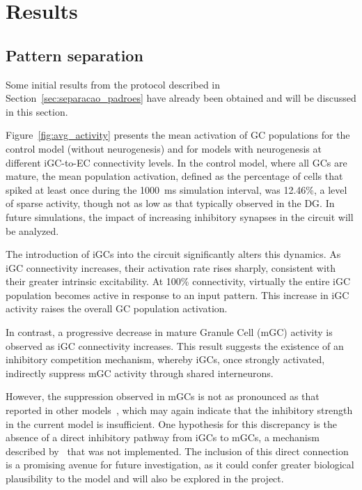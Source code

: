 \chapter{Results}

\section{Pattern separation}


Some initial results from the protocol described in Section~\ref{sec:separacao_padroes} have already been obtained and will be
discussed in this section.

Figure~\ref{fig:avg_activity} presents the mean activation of GC populations for the control model (without neurogenesis) and
for models with neurogenesis at different iGC-to-EC connectivity levels. In the control model, where all GCs are mature, the
mean population activation, defined as the percentage of cells that spiked at least once during the \SI{1000}{\milli\second}
simulation interval, was 12.46\%, a level of sparse activity, though not as low as that typically observed in the DG\@. In
future simulations, the impact of increasing inhibitory synapses in the circuit will be analyzed.

The introduction of iGCs into the circuit significantly alters this dynamics. As iGC connectivity increases, their activation
rate rises sharply, consistent with their greater intrinsic excitability. At 100\% connectivity, virtually the entire iGC
population becomes active in response to an input pattern. This increase in iGC activity raises the overall GC population
activation.

In contrast, a progressive decrease in mature Granule Cell (mGC) activity is observed as iGC connectivity increases. This
result suggests the existence of an inhibitory competition mechanism, whereby iGCs, once strongly activated, indirectly suppress
mGC activity through shared interneurons.

However, the suppression observed in mGCs is not as pronounced as that reported in other models~\parencite{kimEffect2024}, which may
again indicate that the inhibitory strength in the current model is insufficient. One hypothesis for this discrepancy is the
absence of a direct inhibitory pathway from iGCs to mGCs, a mechanism described by~\textcite{lunaAdultborn2019} that was not
implemented. The inclusion of this direct connection is a promising avenue for future investigation, as it could confer greater
biological plausibility to the model and will also be explored in the project.

